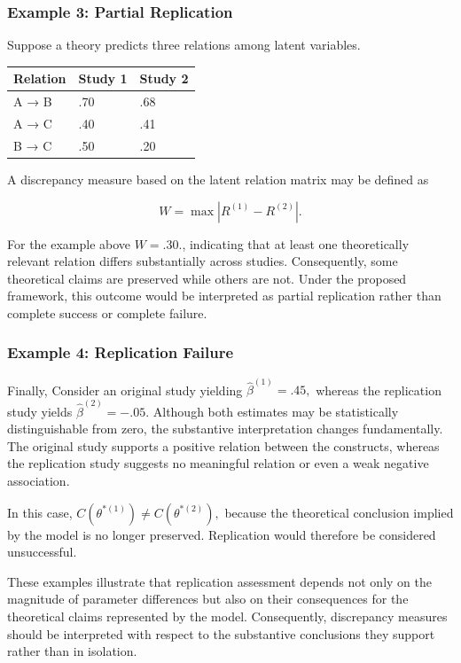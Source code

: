 \documentclass[
  12pt,
  letterpaper,
  man]{apa7}
\newcounter{none} %
\begin{document}
\subsubsection{Example 3: Partial
Replication}\label{example-3-partial-replication}

Suppose a theory predicts three relations among latent variables.

{\def\LTcaptype{none} %
\begin{longtable}[]{@{}lll@{}}
\toprule\noalign{}
Relation & Study 1 & Study 2 \\
\midrule\noalign{}
\endhead
\bottomrule\noalign{}
\endlastfoot
A → B & .70 & .68 \\
A → C & .40 & .41 \\
B → C & .50 & .20 \\
\end{longtable}
}

A discrepancy measure based on the latent relation matrix may be defined
as

\[
W=
\max
\left|
R^{(1)}-R^{(2)}
\right|.
\]

For the example above \(W=.30.\), indicating that at least one
theoretically relevant relation differs substantially across studies.
Consequently, some theoretical claims are preserved while others are
not. Under the proposed framework, this outcome would be interpreted as
partial replication rather than complete success or complete failure.

\subsubsection{Example 4: Replication
Failure}\label{example-4-replication-failure}

Finally, Consider an original study yielding \(\hat{\beta}^{(1)}=.45,\)
whereas the replication study yields \(\hat{\beta}^{(2)}=-.05.\)
Although both estimates may be statistically distinguishable from zero,
the substantive interpretation changes fundamentally. The original study
supports a positive relation between the constructs, whereas the
replication study suggests no meaningful relation or even a weak
negative association.

In this case,
\(C\left(\theta^{*(1)}\right)\neq C\left(\theta^{*(2)}\right),\) because
the theoretical conclusion implied by the model is no longer preserved.
Replication would therefore be considered unsuccessful.

These examples illustrate that replication assessment depends not only
on the magnitude of parameter differences but also on their consequences
for the theoretical claims represented by the model. Consequently,
discrepancy measures should be interpreted with respect to the
substantive conclusions they support rather than in isolation.
\end{document}
